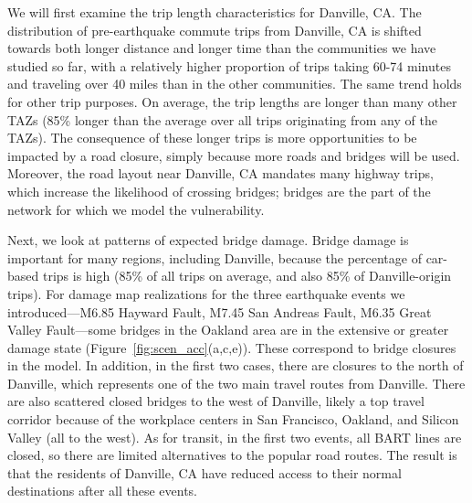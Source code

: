 
We will first examine the trip length characteristics for Danville, CA. %
The distribution of pre-earthquake commute trips from Danville, CA is shifted towards both longer distance and longer time than the communities we have studied so far, with a relatively higher proportion of trips taking 60-74 minutes and traveling over 40 miles than in the other communities. The same trend holds for other trip purposes. On average, the trip lengths are longer than many other TAZs (85\% longer than the average over all trips originating from any of the TAZs). The consequence of these longer trips is more opportunities to be impacted by a road closure, simply because more roads and bridges will be used. Moreover, the road layout near Danville, CA mandates many highway trips, which increase the likelihood of crossing bridges; bridges are the part of the network for which we model the vulnerability. 


Next, we look at patterns of expected bridge damage. Bridge damage is important for many regions, including Danville, because the percentage of car-based trips is high (85\% of all trips on average, and also 85\% of Danville-origin trips). For damage map realizations for the three  earthquake events we introduced---M6.85 Hayward Fault, M7.45 San Andreas Fault, M6.35 Great Valley Fault---some bridges in the Oakland area are in the extensive or greater damage state (Figure~\ref{fig:scen_acc}{(a,c,e)}). These correspond to bridge closures in the model. In addition, in the first two cases, there are closures to the north of Danville, which represents one of the two main travel routes from Danville. There are also scattered closed bridges to the west of Danville, likely a top travel corridor because of the workplace centers in San Francisco, Oakland, and Silicon Valley (all to the west). As for transit, in the first two events, all BART lines are closed, so there are limited alternatives to the popular road routes. The result is that the residents of Danville, CA have reduced access to their normal destinations after all these events. 

